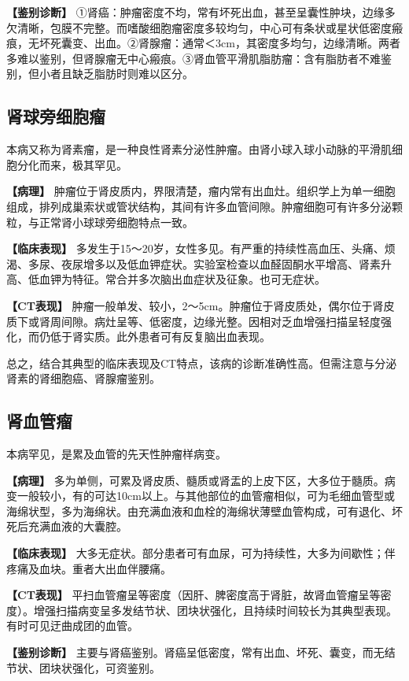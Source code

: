 \textbf{【鉴别诊断】}
①肾癌：肿瘤密度不均，常有坏死出血，甚至呈囊性肿块，边缘多欠清晰，包膜不完整。而嗜酸细胞瘤密度多较均匀，中心可有条状或星状低密度瘢痕，无坏死囊变、出血。②肾腺瘤：通常＜3cm，其密度多均匀，边缘清晰。两者多难以鉴别，但肾腺瘤无中心瘢痕。③肾血管平滑肌脂肪瘤：含有脂肪者不难鉴别，但小者且缺乏脂肪时则难以区分。

\subsection{肾球旁细胞瘤}

本病又称为肾素瘤，是一种良性肾素分泌性肿瘤。由肾小球入球小动脉的平滑肌细胞分化而来，极其罕见。

\textbf{【病理】}
肿瘤位于肾皮质内，界限清楚，瘤内常有出血灶。组织学上为单一细胞组成，排列成巢索状或管状结构，其间有许多血管间隙。肿瘤细胞可有许多分泌颗粒，与正常肾小球球旁细胞特点一致。

\textbf{【临床表现】}
多发生于15～20岁，女性多见。有严重的持续性高血压、头痛、烦渴、多尿、夜尿增多以及低血钾症状。实验室检查以血醛固酮水平增高、肾素升高、低血钾为特征。常合并多次脑出血症状及征象。也可无症状。

\textbf{【CT表现】}
肿瘤一般单发、较小，2～5cm。肿瘤位于肾皮质处，偶尔位于肾皮质下或肾周间隙。病灶呈等、低密度，边缘光整。因相对乏血增强扫描呈轻度强化，而仍低于肾实质。此外患者可有反复脑出血表现。

总之，结合其典型的临床表现及CT特点，该病的诊断准确性高。但需注意与分泌肾素的肾细胞癌、肾腺瘤鉴别。

\subsection{肾血管瘤}

本病罕见，是累及血管的先天性肿瘤样病变。

\textbf{【病理】}
多为单侧，可累及肾皮质、髓质或肾盂的上皮下区，大多位于髓质。病变一般较小，有的可达10cm以上。与其他部位的血管瘤相似，可为毛细血管型或海绵状型，多为海绵状。由充满血液和血栓的海绵状薄壁血管构成，可有退化、坏死后充满血液的大囊腔。

\textbf{【临床表现】}
大多无症状。部分患者可有血尿，可为持续性，大多为间歇性；伴疼痛及血块。重者大出血伴腰痛。

\textbf{【CT表现】}
平扫血管瘤呈等密度（因肝、脾密度高于肾脏，故肾血管瘤呈等密度）。增强扫描病变呈多发结节状、团块状强化，且持续时间较长为其典型表现。有时可见迂曲成团的血管。

\textbf{【鉴别诊断】}
主要与肾癌鉴别。肾癌呈低密度，常有出血、坏死、囊变，而无结节状、团块状强化，可资鉴别。

